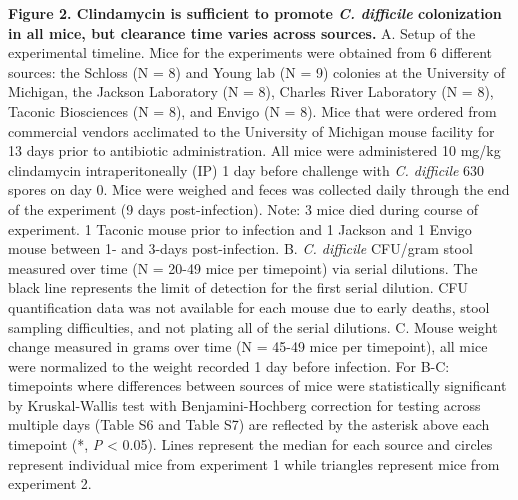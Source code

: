 \documentclass[
  11pt,
]{article}
\begin{document}
\textbf{Figure 2. Clindamycin is sufficient to promote \emph{C.
difficile} colonization in all mice, but clearance time varies across
sources.} A. Setup of the experimental timeline. Mice for the
experiments were obtained from 6 different sources: the Schloss (N = 8)
and Young lab (N = 9) colonies at the University of Michigan, the
Jackson Laboratory (N = 8), Charles River Laboratory (N = 8), Taconic
Biosciences (N = 8), and Envigo (N = 8). Mice that were ordered from
commercial vendors acclimated to the University of Michigan mouse
facility for 13 days prior to antibiotic administration. All mice were
administered 10 mg/kg clindamycin intraperitoneally (IP) 1 day before
challenge with \emph{C. difficile} 630 spores on day 0. Mice were
weighed and feces was collected daily through the end of the experiment
(9 days post-infection). Note: 3 mice died during course of experiment.
1 Taconic mouse prior to infection and 1 Jackson and 1 Envigo mouse
between 1- and 3-days post-infection. B. \emph{C. difficile} CFU/gram
stool measured over time (N = 20-49 mice per timepoint) via serial
dilutions. The black line represents the limit of detection for the
first serial dilution. CFU quantification data was not available for
each mouse due to early deaths, stool sampling difficulties, and not
plating all of the serial dilutions. C. Mouse weight change measured in
grams over time (N = 45-49 mice per timepoint), all mice were normalized
to the weight recorded 1 day before infection. For B-C: timepoints where
differences between sources of mice were statistically significant by
Kruskal-Wallis test with Benjamini-Hochberg correction for testing
across multiple days (Table S6 and Table S7) are reflected by the
asterisk above each timepoint (*, \emph{P} \textless{} 0.05). Lines
represent the median for each source and circles represent individual
mice from experiment 1 while triangles represent mice from experiment 2.

\newpage
\end{document}
